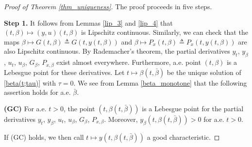 \documentclass[10pt]{article}
\numberwithin{equation}{section}
\begin{document}
	\begin{proof}[Proof of Theorem \ref{thm_uniqueness}]
		The proof proceeds in five steps.
		
		\textbf{Step 1.} It follows from Lemmas \ref{lip_3} and \ref{lip_4} that $(t,\beta)\mapsto (y,u)(t,\beta)$ is Lipschitz continuous. Similarly, we can check that the maps $\beta\mapsto G(t,\beta)\triangleq G(t,y(t,\beta))$ and $\beta\mapsto P_x(t,\beta)\triangleq P_x(t,y(t,\beta))$ are also Lipschitz continuous. By Rademacher’s theorem, the partial derivatives $y_t$, $y_\beta$, $u_t$, $u_\beta$, $G_\beta$, $P_{x,\beta}$ exist almost everywhere. Furthermore, a.e. point $(t,\beta)$ is a Lebesgue point for these derivatives. Let $t\mapsto\beta(t,\bar{\beta})$ be the unique solution of \eqref{beta(t;tau)} with $\tau=0$. We see from Lemma \ref{beta_monotone} that the following assertion holds for a.e. $\bar{\beta}$.
		
		\textbf{(GC)} For a.e. $t>0$, the point $(t,\beta(t,\bar{\beta}))$ is a Lebesgue point for the partial derivatives $y_t$, $y_\beta$, $u_t$, $u_\beta$, $G_\beta$, $P_{x,\beta}$. Moreover, $y_\beta(t,\beta(t,\bar{\beta}))>0$ for a.e. $t>0$.
		
		If (GC) holds, we then call $t\mapsto y(t,\beta(t,\bar{\beta}))$ a good characteristic.
		

\end{proof}
\end{document}
